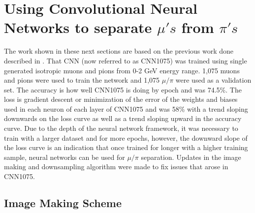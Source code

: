 
\chapter{Using Convolutional Neural Networks to separate ${\mu}'s$ from ${\pi}'s$}\label{ch:cnn_results}


The work shown in these next sections are based on the previous work done described in \cite{priorwork}. That CNN (now referred to as CNN1075) was trained using single generated isotropic muons and pions from 0-2 GeV energy range. 1,075 muons and pions were used to train the network and 1,075 $\mu/\pi$ were used as a validation set. The accuracy is how well CNN1075 is doing by epoch and was 74.5\%. The loss is gradient descent or minimization of the error of the weights and biases used in each neuron of each layer of CNN1075 and was 58\% with a trend sloping downwards on the loss curve as well as a trend sloping upward in the accuracy curve. Due to the depth of the neural network framework, it was necessary to train with a larger dataset and for more epochs, however, the downward slope of the loss curve is an indication that once trained for longer with a higher training sample, neural networks can be used for $\mu/\pi$ separation. Updates in the image making and downsampling algorithm were made to fix issues that arose in CNN1075. 

\section{Image Making Scheme}\label{image_making} 

